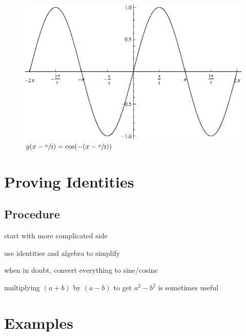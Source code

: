 \documentclass{exam}
\begin{document}
  \begin{figure}[H]
    \centering
    \includegraphics[scale=0.7]{sine_x}
    \caption{$g(x - \sfrac{\pi}{2}) = \cos(- ( x - \sfrac{\pi}{2}))$}
  \end{figure}

  \section{Proving Identities}
  \subsection{Procedure}
  \begin{itemize*}
    \item start with more complicated side
    \item use identities and algebra to simplify
    \item when in doubt, convert everything to sine/cosine
    \item multiplying $(a + b)$ by $(a - b)$ to get $a^2 - b^2$ is sometimes useful
  \end{itemize*}

  \section{Examples}
\end{document}
